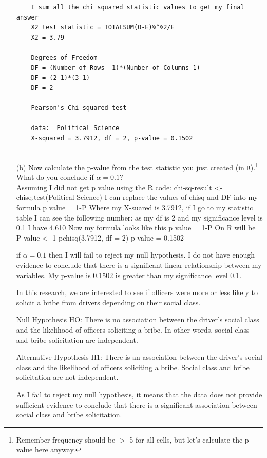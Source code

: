 \documentclass[12pt,letterpaper]{article}
\begin{document}
\begin{enumerate}
\begin{verbatim}
	I sum all the chi squared statistic values to get my final answer 
	X2 test statistic = TOTALSUM(O-E)%^%2/E
	X2 = 3.79
	
	Degrees of Freedom
	DF = (Number of Rows -1)*(Number of Columns-1)
	DF = (2-1)*(3-1)
	DF = 2
	
	Pearson's Chi-squared test
	
	data:  Political Science
	X-squared = 3.7912, df = 2, p-value = 0.1502
	
\end{verbatim}
	
	\item [(b)]
	Now calculate the p-value from the test statistic you just created (in \texttt{R}).\footnote{Remember frequency should be $>$ 5 for all cells, but let's calculate the p-value here anyway.}  What do you conclude if $\alpha = 0.1$?\\
	
	Assuming I did not get p value using the R code: chi-sq-result <- chisq.test(Political-Science)
	I can replace the values of chisq and DF into my formula p value = 1-P%
	Where my X-suared is 3.7912, if I go to my statistic table I can see the following number:
	as my df is 2 and my significance level is 0.1 I have 4.610
	Now my formula looks like this p value = 1-P%
	On R will be P-value <- 1-pchisq(3.7912, df = 2)
	p-value = 0.1502
	
	if $\alpha = 0.1$ then I will fail to reject my null hypothesis. I do not have enough evidence to conclude that there is a significant 
	linear relationship between my variables. My p-value is 0.1502 is greater than my significance level 0.1. 
	
	In this research, we are interested to see if officers were more or less likely to solicit a bribe from drivers depending on their
	social class. 
	
	Null Hypothesis HO: There is no association between the driver's social class and the likelihood of officers soliciting a bribe. In other words, social class and bribe solicitation are independent.
	
	Alternative Hypothesis H1: There is an association between the driver's social class and the likelihood of officers soliciting a bribe. Social class and bribe solicitation are not independent.
	
	As I fail to reject my null hypothesis, it means that the data does not provide sufficient evidence to conclude that there is a significant association between social class and bribe solicitation. 



\end{enumerate}
\end{document}
